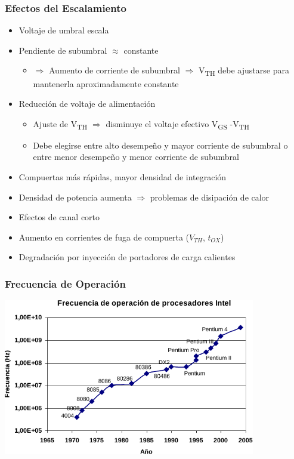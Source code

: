 \documentclass[t,aspectratio=169,10pt]{beamer}
\begin{document}
\begin{frame}
\frametitle{Efectos del Escalamiento}
\begin{itemize}
	\item Voltaje de umbral escala
	\item Pendiente de subumbral $\approx$ constante
	\begin{itemize}
		\item $\Rightarrow$ Aumento de corriente de subumbral $\Rightarrow$ V\textsubscript{TH} debe ajustarse para mantenerla aproximadamente constante
	\end{itemize}
	\item Reducción de voltaje de alimentación
	\begin{itemize}
		\item Ajuste de V\textsubscript{TH} $\Rightarrow$ disminuye el voltaje efectivo V\textsubscript{GS} -V\textsubscript{TH}
		\item Debe elegirse entre alto desempeño y mayor corriente de subumbral o entre menor desempeño y menor corriente de subumbral
	\end{itemize}
	\item Compuertas más rápidas, mayor densidad de integración
	\item Densidad de potencia aumenta $\Rightarrow$ problemas de disipación de calor
	\item Efectos de canal corto
	\item Aumento en corrientes de fuga de compuerta ($V_{TH}$, $t_{OX}$)
	\item Degradación por inyección de portadores de carga calientes
\end{itemize}
\end{frame}


\begin{frame}
\frametitle{Frecuencia de Operación}
\centering
\includegraphics[width=11cm]{freqop}
\end{frame}
\end{document}
